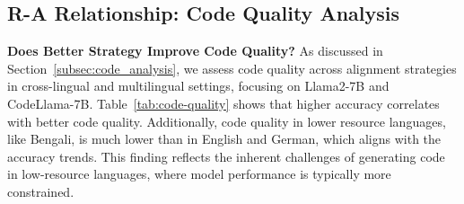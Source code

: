 \subsection{R-A Relationship: Code Quality Analysis}
\label{section:code-analysis-results}


\textbf{Does Better Strategy Improve Code Quality?}
As discussed in Section~\ref{subsec:code_analysis}, we assess code quality across alignment strategies in cross-lingual and multilingual settings, focusing on Llama2-7B and CodeLlama-7B.
%
Table~\ref{tab:code-quality} shows that higher accuracy correlates with better code quality.
% 
Additionally, code quality in lower resource languages, like Bengali, is much lower than in English and German, which aligns with the accuracy trends.
%
This finding reflects the inherent challenges of generating code in low-resource languages, where model performance is typically more constrained.
%
